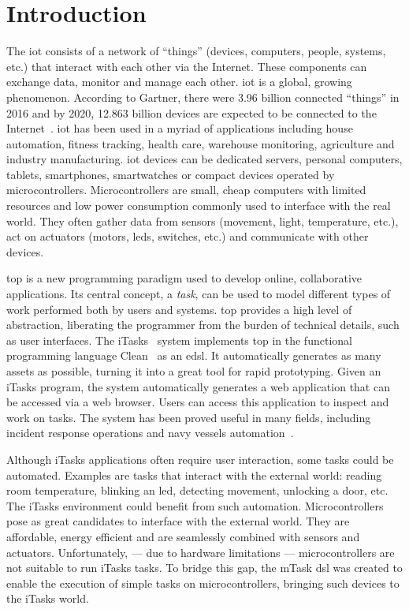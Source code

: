 \section{Introduction}
The \ac{iot} consists of a network of ``things'' (devices, computers, people, systems, etc.) that interact with each other via the Internet. These components can exchange data, monitor and manage each other. \ac{iot} is a global, growing phenomenon. According to Gartner, there were 3.96 billion connected ``things'' in 2016 and by 2020, 12.863 billion devices are expected to be connected to the Internet~\cite{iot_numbers}. \ac{iot} has been used in a myriad of applications including house automation, fitness tracking, health care, warehouse monitoring, agriculture and industry manufacturing. \ac{iot} devices can be dedicated servers, personal computers, tablets, smartphones, smartwatches or compact devices operated by microcontrollers. Microcontrollers are small, cheap computers with limited resources and low power consumption commonly used to interface with the real world. They often gather data from sensors (movement, light, temperature, etc.), act on actuators (motors, \acsp{led}, switches, etc.) and communicate with other devices.

\ac{top} is a new programming paradigm used to develop online, collaborative applications. Its central concept, a \textit{task}, can be used to model different types of work performed both by users and systems. \ac{top} provides a high level of abstraction, liberating the programmer from the burden of technical details, such as user interfaces. The iTasks~\cite{top} system implements \ac{top} in the functional programming language Clean~\cite{clean} as an \ac{edsl}. It automatically generates as many assets as possible, turning it into a great tool for rapid prototyping. Given an iTasks program, the system automatically generates a web application that can be accessed via a web browser. Users can access this application to inspect and work on tasks. The system has been proved useful in many fields, including incident response operations and navy vessels automation~\cite{incidone,navy}.

Although iTasks applications often require user interaction, some tasks could be automated. Examples are tasks that interact with the external world: reading room temperature, blinking an \acs{led}, detecting movement, unlocking a door,  etc. The iTasks environment could benefit from such automation. Microcontrollers pose as great candidates to interface with the external world. They are affordable, energy efficient and are seamlessly combined with sensors and actuators. Unfortunately, --- due to hardware limitations --- microcontrollers are not suitable to run iTasks tasks. To bridge this gap, the mTask \ac{dsl} was created to enable the execution of simple tasks on microcontrollers, bringing such devices to the iTasks world.


